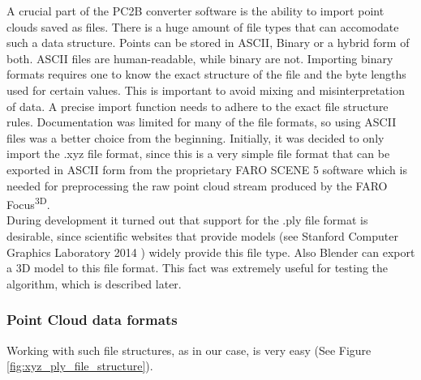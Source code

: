 A crucial part of the PC2B converter software is the ability to import point clouds saved as files. There is a huge amount of file types that can accomodate such a data structure. Points can be stored in ASCII, Binary or a hybrid form of both. ASCII files are human-readable, while binary are not. Importing binary formats requires one to know the exact structure of the file and the byte lengths used for certain values. This is important to avoid mixing and misinterpretation of data. A precise import function needs to adhere to the exact file structure rules. Documentation was limited for many of the file formats, so using ASCII files was a better choice from the beginning. Initially, it was decided to only import the .xyz file format, since this is a very simple file format that can be exported in ASCII form from the proprietary FARO SCENE 5 software which is needed for preprocessing the raw point cloud stream produced by the FARO Focus\textsuperscript{3D}.\\
During development it turned out that support for the .ply file format is desirable, since scientific websites that provide models (see Stanford Computer Graphics Laboratory 2014 \parencite{Stanford_repo}) widely provide this file type. Also Blender can export a 3D model to this file format. This fact was extremely useful for testing the algorithm, which is described later.

\subsubsection{Point Cloud data formats}

Working with such file structures, as in our case, is very easy (See Figure \ref{fig:xyz_ply_file_structure}).


